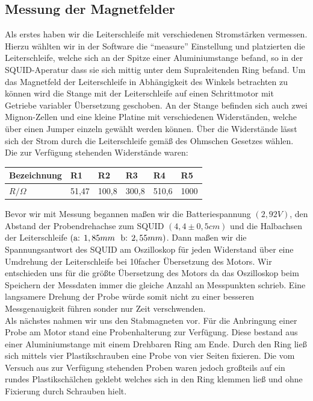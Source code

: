 \documentclass[12pt]{article}
\begin{document}
\subsection{Messung der Magnetfelder}
Als erstes haben wir die Leiterschleife mit verschiedenen Stromstärken vermessen.
Hierzu wählten wir in der Software die "`measure"' Einstellung und platzierten die Leiterschleife, welche sich an der Spitze einer Aluminiumstange befand, so in der SQUID-Aperatur dass sie sich mittig unter dem Supraleitenden Ring befand. Um das Magnetfeld der Leiterschleife in Abhängigkeit des Winkels betrachten zu können wird die Stange mit der Leiterschleife auf einen Schrittmotor mit Getriebe variabler Übersetzung geschoben. An der Stange befinden sich auch zwei Mignon-Zellen und eine kleine Platine mit verschiedenen Widerständen, welche über einen Jumper einzeln gewählt werden können. Über die Widerstände lässt sich der Strom durch die Leiterschleife gemäß des Ohmschen Gesetzes wählen. Die zur Verfügung stehenden Widerstände waren:
\begin{center}
\begin{tabular}{|l|lllll|}
\hline 
Bezeichnung & R1 & R2 & R3 & R4 & R5\\
\hline 
$R / \Omega$ & 51,47 & 100,8 & 300,8 & 510,6 & 1000\\
\hline 
\end{tabular}
\end{center}
Bevor wir mit Messung begannen maßen wir die Batteriespannung $(2,92V)$, den Abstand der Probendrehachse zum SQUID $(4,4 \pm 0,5 cm)$ und die Halbachsen der Leiterschleife $(\textnormal{a: }1,85mm~\textnormal{ b: }2,55mm)$. Dann maßen wir die Spannungsantwort des SQUID am Oszilloskop für jeden Widerstand über eine Umdrehung der Leiterschleife bei 10facher Übersetzung des Motors. Wir entschieden uns für die größte Übersetzung des Motors da das Oszilloskop beim Speichern der Messdaten immer die gleiche Anzahl an Messpunkten schrieb. Eine langsamere Drehung der Probe würde somit nicht zu einer besseren Messgenauigkeit führen sonder nur Zeit verschwenden.\\

Als nächstes nahmen wir uns den Stabmagneten vor. Für die Anbringung einer Probe am Motor stand eine Probenhalterung zur Verfügung. Diese bestand aus einer Aluminiumstange mit einem Drehbaren Ring am Ende. Durch den Ring ließ sich mittels vier Plastikschrauben eine Probe von vier Seiten fixieren. Die vom Versuch aus zur Verfügung stehenden Proben waren jedoch großteils auf ein rundes Plastikschälchen geklebt welches sich in den Ring klemmen ließ und ohne Fixierung durch Schrauben hielt.
\end{document}
